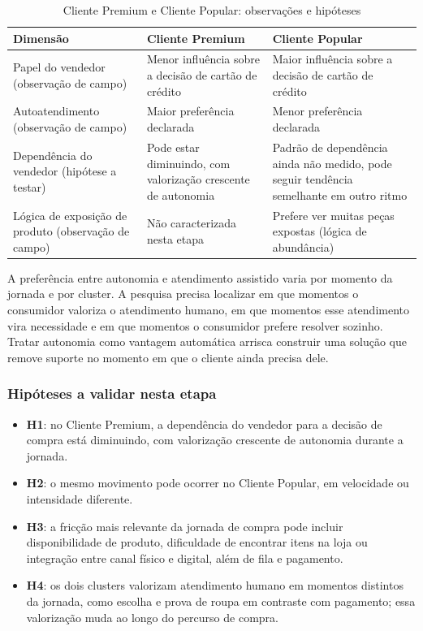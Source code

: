 \begin{table}[h!]
    \centering
    \caption{Cliente Premium e Cliente Popular: observações e hipóteses}
    \begin{tabular}{p{2.6cm}p{4.6cm}p{4.6cm}}
        \toprule
        \textbf{Dimensão} & \textbf{Cliente Premium} & \textbf{Cliente Popular}\\
        \midrule
        Papel do vendedor (observação de campo) & Menor influência sobre a decisão de cartão de crédito & Maior influência sobre a decisão de cartão de crédito\\
        Autoatendimento (observação de campo) & Maior preferência declarada & Menor preferência declarada\\
        Dependência do vendedor (hipótese a testar) & Pode estar diminuindo, com valorização crescente de autonomia & Padrão de dependência ainda não medido, pode seguir tendência semelhante em outro ritmo\\
        Lógica de exposição de produto (observação de campo) & Não caracterizada nesta etapa & Prefere ver muitas peças expostas (lógica de abundância)\\
        \bottomrule
    \end{tabular}
    \label{tab:segmentacao_grupos}
\end{table}

A preferência entre autonomia e atendimento assistido varia por momento da jornada e por cluster. A pesquisa precisa localizar em que momentos o consumidor valoriza o atendimento humano, em que momentos esse atendimento vira necessidade e em que momentos o consumidor prefere resolver sozinho. Tratar autonomia como vantagem automática arrisca construir uma solução que remove suporte no momento em que o cliente ainda precisa dele.

\subsubsection{Hipóteses a validar nesta etapa}
\label{subsubsec:segmentacao_hipoteses}

\begin{itemize}
    \item \textbf{H1}: no Cliente Premium, a dependência do vendedor para a decisão de compra está diminuindo, com valorização crescente de autonomia durante a jornada.
    \item \textbf{H2}: o mesmo movimento pode ocorrer no Cliente Popular, em velocidade ou intensidade diferente.
    \item \textbf{H3}: a fricção mais relevante da jornada de compra pode incluir disponibilidade de produto, dificuldade de encontrar itens na loja ou integração entre canal físico e digital, além de fila e pagamento.
    \item \textbf{H4}: os dois clusters valorizam atendimento humano em momentos distintos da jornada, como escolha e prova de roupa em contraste com pagamento; essa valorização muda ao longo do percurso de compra.
\end{itemize}

